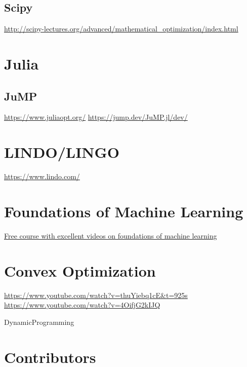 \documentclass[letter,12pt]{book}
\renewcommand{\0}{\mathbf{0}}
\begin{document}
\subsection{Scipy}

\url{http://scipy-lectures.org/advanced/mathematical_optimization/index.html}

\section{Julia}
\subsection{JuMP}
\url{https://www.juliaopt.org/}
\url{https://jump.dev/JuMP.jl/dev/}

\section{LINDO/LINGO}
\url{https://www.lindo.com/}

\section{Foundations of Machine Learning}
\href{https://bloomberg.github.io/foml/#home}{Free course with excellent videos on foundations of machine learning}
\section{Convex Optimization}
\url{https://www.youtube.com/watch?v=thuYiebq1cE&t=925s}
\url{https://www.youtube.com/watch?v=4OifjG2kIJQ}

{DynamicProgramming}

\section{Contributors}
	
	\cleardoublepage

	
	
	\cleardoublepage
\end{document}
